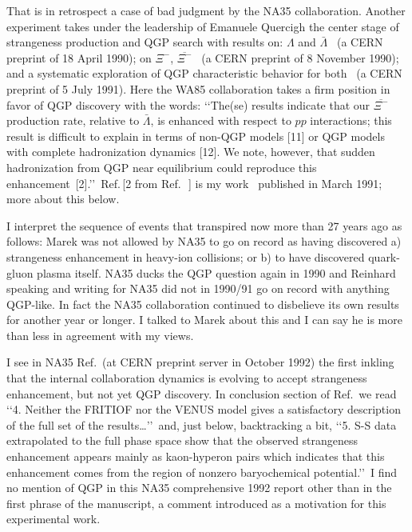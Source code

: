 \documentclass{appolb}
\begin{document}
That is in retrospect a case of bad judgment by the NA35 collaboration. Another experiment takes under the leadership of Emanuele Quercigh the center stage of strangeness production and QGP search with results on: $\Lambda$ and $\bar{\Lambda}$~\cite{Abatzis:1990cm} (a CERN preprint of 18 April 1990); on $\Xi^-$, $\overline{\Xi^-}$~\cite{Abatzis:1990gz} (a CERN preprint of 8 November 1990); and a systematic exploration of QGP characteristic behavior for both~\cite{Abatzis:1991ju} (a CERN preprint of 5 July 1991). Here the WA85 collaboration takes a firm position in favor of QGP discovery with the words: \lq\lq The(se) results indicate that our $\overline{\Xi^-}$ production rate, relative to $\bar{\Lambda}$, is enhanced with respect to $pp$ interactions; this result is difficult to explain in terms of non-QGP models [11] or QGP models with complete hadronization dynamics [12]. We note, however, that sudden hadronization from QGP near equilibrium could reproduce this enhancement~[2].\rq\rq\ Ref.\,[2 from Ref.\,~\cite{Abatzis:1991ju}] is my work~\cite{Rafelski:1991rh} published in March 1991; more about this below. 

I interpret the sequence of events that transpired now more than 27 years ago as follows: Marek was not allowed by NA35 to go on record as having discovered a) strangeness enhancement in heavy-ion collisions; or b) to have discovered quark-gluon plasma itself. NA35 ducks the QGP question again in 1990 and Reinhard speaking and writing for NA35 did not in 1990/91 go on record with anything QGP-like. In fact the NA35 collaboration continued to disbelieve its own results for another year or longer. I talked to Marek about this and I can say he is more than less in agreement with my views.

I see in NA35 Ref.\,\cite{Bachler:1992js} (at CERN preprint server in October 1992) the first inkling that the internal collaboration dynamics is evolving to accept strangeness enhancement, but not yet QGP discovery. In conclusion section of Ref.\,\cite{Bachler:1992js} we read \lq\lq 4. Neither the FRITIOF nor the VENUS model gives a satisfactory description of the full set of the results\ldots\rq\rq\ and, just below, backtracking a bit, \lq\lq 5. S-S data extrapolated to the full phase space show that the observed strangeness enhancement appears mainly as kaon-hyperon pairs which indicates that this enhancement comes from the region of nonzero baryochemical potential.\rq\rq\ I find no mention of QGP in this NA35 comprehensive 1992 report other than in the first phrase of the manuscript, a comment introduced as a motivation for this experimental work. 
\end{document}
